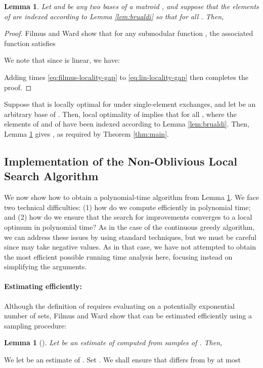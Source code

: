 \documentclass{article}
\newtheorem{lemma}[theorem]{Lemma}
\theoremstyle{definition}
\begin{document}
\begin{lemma}
\label{lem:locality-gap}
Let  and  be any two bases of a matroid , and suppose that the elements of  are indexed according to Lemma \ref{lem:brualdi} so that  for all .  Then,

\end{lemma}
\begin{proof}
Filmus and Ward \cite[Theorem 5.1, p.\ 526]{Filmus2014} show that for any submodular function , the associated function  satisfies

We note that since  is linear, we have:

Adding  times \eqref{eq:filmus-locality-gap} to \eqref{eq:lin-locality-gap} then completes the proof.
\end{proof}

Suppose that  is locally optimal for  under single-element exchanges, and let  be an arbitrary base of .  Then, local optimality of  implies that  for all , where the elements  of  and  of  have been indexed according to Lemma \ref{lem:brualdi}.  Then, Lemma \ref{lem:locality-gap} gives , as required by Theorem \ref{thm:main}.

\subsection{Implementation of the Non-Oblivious Local Search Algorithm}
\label{sec:impl-non-obliv}

We now show how to obtain a polynomial-time algorithm from Lemma \ref{lem:locality-gap}.  We face two technical difficulties:
(1) how do we compute  efficiently in polynomial time; and (2) how do we ensure that the search for improvements converges to a local optimum in polynomial time?  As in the case of the continuous greedy algorithm, we can address these issues by using standard techniques, but we must be careful since  may take negative values.  As in that case, we have not attempted to obtain the most efficient possible running time analysis here, focusing instead on simplifying the arguments.

\paragraph{Estimating  efficiently:}

Although the definition of  requires evaluating  on a potentially exponential number of sets, Filmus and Ward show that  can be estimated efficiently using a sampling procedure:
\begin{lemma}[{\cite[Lemma 5.1, p.\ 525]{Filmus2014}}]
\label{lem:NOsubmodEst}
Let  be an estimate of  computed from  samples of .  Then, 

\end{lemma}
We let  be an estimate of .  Set .
We shall ensure that  differs from  by at most
\end{document}
